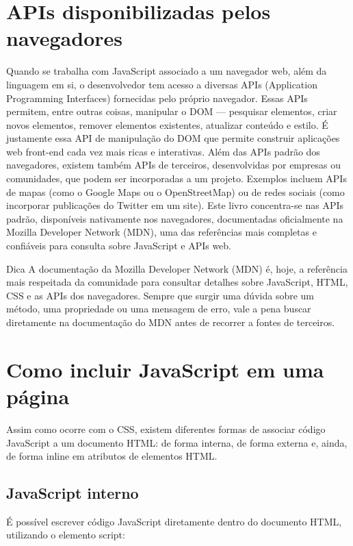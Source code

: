 \section{APIs disponibilizadas pelos navegadores}

Quando se trabalha com JavaScript associado a um navegador web, além da linguagem em si, o desenvolvedor tem acesso a diversas APIs (Application Programming Interfaces) fornecidas pelo próprio navegador. Essas APIs permitem, entre outras coisas, manipular o DOM — pesquisar elementos, criar novos elementos, remover elementos existentes, atualizar conteúdo e estilo. É justamente essa API de manipulação do DOM que permite construir aplicações web front-end cada vez mais ricas e interativas. Além das APIs padrão dos navegadores, existem também APIs de terceiros, desenvolvidas por empresas ou comunidades, que podem ser incorporadas a um projeto. Exemplos incluem APIs de mapas (como o Google Maps ou o OpenStreetMap) ou de redes sociais (como incorporar publicações do Twitter em um site). Este livro concentra-se nas APIs padrão, disponíveis nativamente nos navegadores, documentadas oficialmente na Mozilla Developer Network (MDN), uma das referências mais completas e confiáveis para consulta sobre JavaScript e APIs web.

\begin{infobox}{Dica}
A documentação da Mozilla Developer Network (MDN) é, hoje, a referência mais respeitada da comunidade para consultar detalhes sobre JavaScript, HTML, CSS e as APIs dos navegadores. Sempre que surgir uma dúvida sobre um método, uma propriedade ou uma mensagem de erro, vale a pena buscar diretamente na documentação do MDN antes de recorrer a fontes de terceiros.
\end{infobox}

\section{Como incluir JavaScript em uma página}

Assim como ocorre com o CSS, existem diferentes formas de associar código JavaScript a um documento HTML: de forma interna, de forma externa e, ainda, de forma inline em atributos de elementos HTML.

\subsection{JavaScript interno}

É possível escrever código JavaScript diretamente dentro do documento HTML, utilizando o elemento script:

